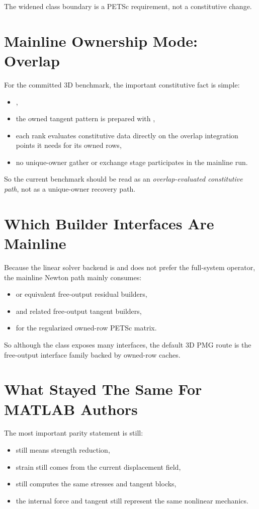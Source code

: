 The widened class boundary is a PETSc requirement, not a constitutive change.

\section{Mainline Ownership Mode: Overlap}

For the committed 3D benchmark, the important constitutive fact is simple:
\begin{itemize}
\item {},
\item the owned tangent pattern is prepared with
,
\item each rank evaluates constitutive data directly on the overlap integration
points it needs for its owned rows,
\item no unique-owner gather or exchange stage participates in the mainline
run.
\end{itemize}

So the current benchmark should be read as an \emph{overlap-evaluated
constitutive path}, not as a unique-owner recovery path.

\section{Which Builder Interfaces Are Mainline}

Because the linear solver backend is  and does not prefer the
full-system operator, the mainline Newton path mainly consumes:
\begin{itemize}
\item {} or equivalent free-output residual builders,
\item {} and related free-output
tangent builders,
\item {} for the regularized owned-row PETSc
matrix.
\end{itemize}

So although the class exposes many interfaces, the default 3D PMG route is the
free-output interface family backed by owned-row caches.

\section{What Stayed The Same For MATLAB Authors}

The most important parity statement is still:
\begin{itemize}
\item {} still means strength reduction,
\item strain still comes from the current displacement field,
\item {} still computes the same stresses and
tangent blocks,
\item the internal force and tangent still represent the same nonlinear
mechanics.
\end{itemize}

